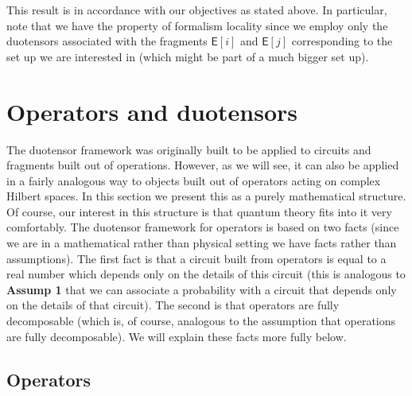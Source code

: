 \documentclass[10pt]{article}
\begin{document}
This result is in accordance with our objectives as stated above.  In particular, note that we have the property of formalism locality since we employ only the duotensors associated with the fragments $\mathsf{E}[i]$ and $\mathsf{E}[j]$ corresponding to the set up we are interested in (which might be part of a much bigger set up).


\section{Operators and duotensors}\label{operatorsandduotensors}

The duotensor framework was originally built to be applied to circuits and fragments built out of operations.  However, as we will see, it can also be applied in a fairly analogous way to objects built out of operators acting on complex Hilbert spaces.  In this section we present this as a purely mathematical structure.  Of course, our interest in this structure is that quantum theory fits into it very comfortably.  The duotensor framework for operators is based on two facts (since we are in a mathematical rather than physical setting we have facts rather than assumptions).  The first fact is that a circuit built from operators is equal to a real number which depends only on the details of this circuit (this is analogous to {\bf Assump 1} that we can associate a probability with a circuit that depends only on the details of that circuit).  The second is that operators are fully decomposable (which is, of course, analogous to the assumption that operations are fully decomposable).  We will explain these facts more fully below.

\subsection{Operators}
\end{document}
